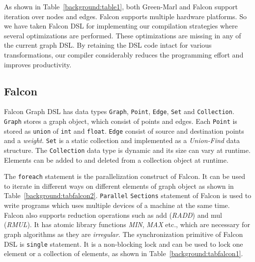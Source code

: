 As shown in  Table~\ref{background:table1}, both Green-Marl and Falcon support iteration over nodes and edges. Falcon supports multiple hardware platforms. So we have taken Falcon DSL for implementing our compilation strategies where several optimizations are performed. These optimizations are missing in any of the current graph DSL. By retaining the DSL code intact for various transformations, our compiler considerably reduces the programming effort and improves productivity.

\subsection{Falcon}
Falcon Graph DSL has data types {\tt Graph}, {\tt Point}, {\tt Edge}, {\tt Set} and {\tt Collection}. \texttt{Graph} stores a graph object, which consist of points and edges. Each {\tt Point} is stored as {\tt union} of   {\tt int} and {\tt float}.
{\tt Edge} consist of source and destination points and  a {\it weight}. {\tt Set} is a static collection and implemented as a {\it Union-Find} data structure. The {\tt Collection} data type is dynamic and its size can vary at runtime. Elements can be added to  and deleted from a collection object at runtime.

 The {\tt foreach} statement is the parallelization construct of Falcon.
 It can be used to  iterate in different ways on different elements of graph object as  shown in Table~\ref{background:tabfalcon2}. 
{\tt Parallel} {\tt  Sections} statement of Falcon is used to write programs which uses multiple devices of a machine at the same time. Falcon also supports reduction operations such as add ({\it RADD}) and mul ({\it RMUL}). It  has atomic library functions {\it MIN}, {\it MAX} etc., which are necessary for graph algorithms as they are {\it irregular}. 
The synchronization primitive of Falcon DSL is {\tt single} statement.
 It is a non-blocking lock and can be used to lock one element or a collection of elements, as shown in Table~\ref{background:tabfalcon1}.

